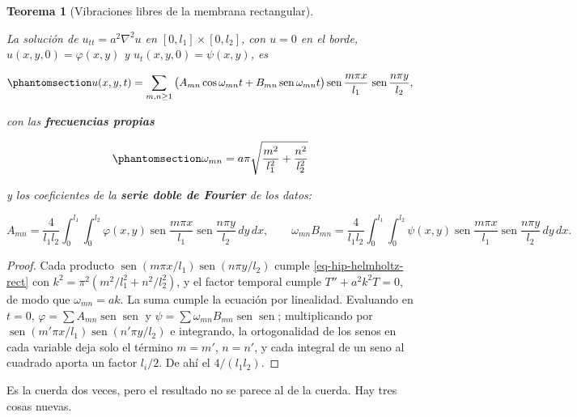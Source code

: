 \documentclass[
  spanish,
  a4paper,
]{scrbook}
\theoremstyle{definition}
\theoremstyle{plain}
\theoremstyle{definition}
\theoremstyle{plain}
\newtheorem{theorem}{Teorema}[chapter]
\theoremstyle{definition}
\theoremstyle{remark}
\begin{document}
\begin{theorem}[Vibraciones libres de la membrana
rectangular]\protect\hypertarget{thm-hip-rectangular}{}\label{thm-hip-rectangular}

La solución de \(u_{tt} = a^2\nabla^2u\) en \([0,l_1]\times[0,l_2]\),
con \(u=0\) en el borde, \(u(x,y,0) = \varphi(x,y)\) y
\(u_t(x,y,0) = \psi(x,y)\), es

\begin{equation}\protect\phantomsection\label{eq-hip-rectangular}{
u(x,y,t) = \sum_{m,n\ge1}\big(A_{mn}\cos\omega_{mn}t + B_{mn}\operatorname{sen}\omega_{mn}t\big)
\operatorname{sen}\frac{m\pi x}{l_1}\,\operatorname{sen}\frac{n\pi y}{l_2},
}\end{equation}

con las \textbf{frecuencias propias}

\begin{equation}\protect\phantomsection\label{eq-hip-frecuencias-rect}{
\omega_{mn} = a\pi\sqrt{\frac{m^2}{l_1^2} + \frac{n^2}{l_2^2}}
}\end{equation}

y los coeficientes de la \textbf{serie doble de Fourier} de los datos:

\[
A_{mn} = \frac{4}{l_1l_2}\int_0^{l_1}\!\!\int_0^{l_2}\varphi(x,y)\operatorname{sen}\frac{m\pi x}{l_1}\operatorname{sen}\frac{n\pi y}{l_2}\,dy\,dx,
\qquad
\omega_{mn}B_{mn} = \frac{4}{l_1l_2}\int_0^{l_1}\!\!\int_0^{l_2}\psi(x,y)\operatorname{sen}\frac{m\pi x}{l_1}\operatorname{sen}\frac{n\pi y}{l_2}\,dy\,dx .
\]

\end{theorem}

\begin{proof}
Cada producto
\(\operatorname{sen}(m\pi x/l_1)\operatorname{sen}(n\pi y/l_2)\) cumple
\ref{eq-hip-helmholtz-rect} con \(k^2 = \pi^2(m^2/l_1^2 + n^2/l_2^2)\),
y el factor temporal cumple \(T'' + a^2k^2T=0\), de modo que
\(\omega_{mn} = ak\). La suma cumple la ecuación por linealidad.
Evaluando en \(t=0\),
\(\varphi = \sum A_{mn}\operatorname{sen}\operatorname{sen}\) y
\(\psi = \sum\omega_{mn}B_{mn}\operatorname{sen}\operatorname{sen}\);
multiplicando por
\(\operatorname{sen}(m'\pi x/l_1)\operatorname{sen}(n'\pi y/l_2)\) e
integrando, la ortogonalidad de los senos en cada variable deja solo el
término \(m=m'\), \(n=n'\), y cada integral de un seno al cuadrado
aporta un factor \(l_i/2\). De ahí el \(4/(l_1l_2)\).
\end{proof}

Es la cuerda dos veces, pero el resultado no se parece al de la cuerda.
Hay tres cosas nuevas.
\end{document}

